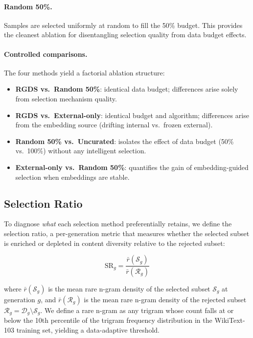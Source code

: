 \paragraph{Random 50\%.} Samples are selected uniformly at random to fill the 50\% budget. This provides the cleanest ablation for disentangling selection quality from data budget effects.

\paragraph{Controlled comparisons.} The four methods yield a factorial ablation structure:

\begin{itemize}
    \item \textbf{RGDS vs.\ Random 50\%}: identical data budget; differences arise solely from selection mechanism quality.
    \item \textbf{RGDS vs.\ External-only}: identical budget and algorithm; differences arise from the embedding source (drifting internal vs.\ frozen external).
    \item \textbf{Random 50\% vs.\ Uncurated}: isolates the effect of data budget (50\% vs.\ 100\%) without any intelligent selection.
    \item \textbf{External-only vs.\ Random 50\%}: quantifies the gain of embedding-guided selection when embeddings are stable.
\end{itemize}

\subsection{Selection Ratio}

To diagnose \emph{what} each selection method preferentially retains, we define the selection ratio, a per-generation metric that measures whether the selected subset is enriched or depleted in content diversity relative to the rejected subset:

\begin{equation}
    \text{SR}_g = \frac{\bar{r}(\mathcal{S}_g)}{\bar{r}(\mathcal{R}_g)}
\end{equation}

\noindent where $\bar{r}(\mathcal{S}_g)$ is the mean rare n-gram density of the selected subset $\mathcal{S}_g$ at generation $g$, and $\bar{r}(\mathcal{R}_g)$ is the mean rare n-gram density of the rejected subset $\mathcal{R}_g = \mathcal{D}_g \setminus \mathcal{S}_g$. We define a rare n-gram as any trigram whose count falls at or below the 10th percentile of the trigram frequency distribution in the WikiText-103 training set, yielding a data-adaptive threshold.

